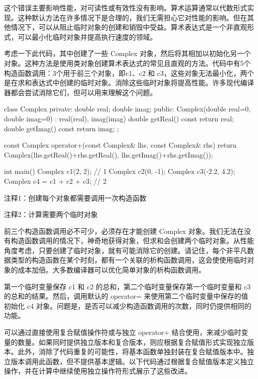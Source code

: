 这个错误主要影响性能，对可读性或有效性没有影响。算术运算通常以代数形式实现。这种默认方法在许多情况下是合理的，我们无需担心它对性能的影响。但在其他情况下，可以从阻止临时对象的创建和销毁中受益。算术表达式是一个非直观形式，可以最小化临时对象并提高执行速度的领域。


考虑一下此代码，其中创建了一些 Complex 对象，然后将其相加以初始化另一个对象。这种方法是使用类对象创建算术表达式的常见且直观的方法。代码中有5个构造函数调用：3个用于前三个对象，即c1、c2 和 c3，这些对象无法最小化，两个是在求和表达式中创建的临时对象。消除这些临时对象将提高性能。许多现代编译器都会尝试消除它们，但可以用来理解这个问题。


\begin{cpp}
class Complex {
private:
  double real;
  double imag;
public:
  Complex(double real=0, double imag=0) : real(real), imag(imag) {}
  double getReal() const { return real; }
  double getImag() const { return imag; }
};

const Complex operator+(const Complex& lhs, const Complex& rhs) {
  return Complex(lhs.getReal()+rhs.getReal(), lhs.getImag()+rhs.getImag());
}

int main() {
  Complex c1(2, 2); // 1
  Complex c2(0, -1);
  Complex c3(-2.2, 4.2);
  Complex c4 = c1 + c2 + c3; // 2
}
\end{cpp}

{\footnotesize
注释1：创建每个对象都需要调用一次构造函数

注释2：计算需要两个临时对象
}


前三个构造函数调用必不可少，必须存在才能创建 Complex 对象。我们无法在没有构造函数调用的情况下，神奇地获得对象，但求和会创建两个临时对象。从性能角度考虑，只要创建了临时对象，就有可能消除它的创建。请记住，每个非平凡数据类型的构造函数在某个时刻，都有一个关联的析构函数调用，这会使使用临时对象的成本加倍。大多数编译器可以优化简单对象的析构函数调用。

第一个临时变量保存 c1 和 c2 的总和，第二个临时变量保存第一个临时变量和 c3 的总和的结果。然后，调用默认的 operator= 来使用第二个临时变量中保存的值初始化 c4 对象。问题是，是否可以减少构造函数调用的次数，同时仍提供相同的功能。


可以通过直接使用复合赋值操作符或与独立 operator+ 结合使用，来减少临时变量的数量。如果同时提供独立版本和复合版本，则应根据复合赋值形式实现独立版本。此外，消除了代码重复的可能性，将基本函数单独封装在复合赋值版本中。独立版本调用此函数，但不提供基本逻辑。以下代码通过根据复合赋值版本定义独立操作，并在计算中继续使用独立操作符形式展示了这些改进。

